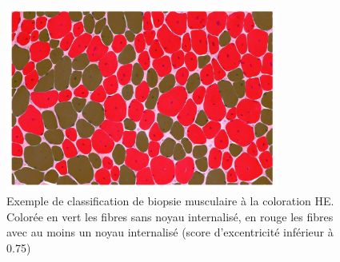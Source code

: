\begin{figure}[htbp]
 \centering
 \includegraphics[width=0.8\textwidth]{figures/he_paint.png}
 \caption[Exemple de classification de biopsie musculaire HE]{Exemple de classification de biopsie musculaire à la coloration HE. Colorée en vert les fibres sans noyau internalisé, en rouge les fibres avec au moins un noyau internalisé (score d'excentricité inférieur à 0.75)}
 \label{fig:he_paint}
\end{figure}

